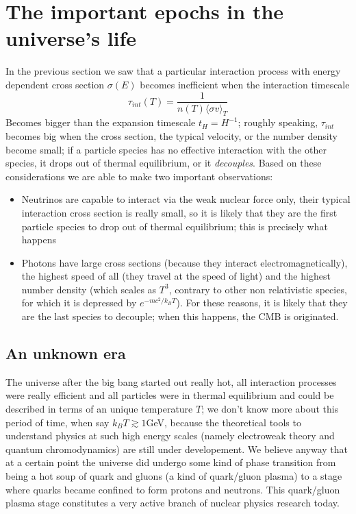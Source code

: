 \documentclass[11pt, a4paper,oneside,openright]{book}
\numberwithin{equation}{section}
\begin{document}
\section{The important epochs in the universe's life}
In the previous section we saw that a particular interaction process with energy dependent cross section $\sigma(E)$ becomes inefficient when the interaction timescale
\begin{equation}
\tau_{int}(T)=\frac{1}{n(T)\langle\sigma v\rangle_T}
\end{equation}
Becomes bigger than the expansion timescale $t_H=H^{-1}$; roughly speaking, $\tau_{int}$ becomes big when the cross section, the typical velocity, or the number density become small; if a particle species has no effective interaction with the other species, it drops out of thermal equilibrium, or it \textit{decouples}. Based on these considerations we are able to make two important observations:
\begin{itemize}
\item Neutrinos are capable to interact via the weak nuclear force only, their typical interaction cross section is really small, so it is likely that they are the first particle species to drop out of thermal equilibrium; this is precisely what happens
\item Photons have large cross sections (because they interact electromagnetically), the highest speed of all (they travel at the speed of light) and the highest number density (which scales as $T^3$, contrary to other non relativistic species, for which it is depressed by $e^{-mc^2/k_BT}$). For these reasons, it is likely that they are the last species to decouple; when this happens, the CMB is originated. 
\end{itemize}
\subsection{An unknown era}
The universe after the big bang started out really hot, all interaction processes were really efficient and all particles were in thermal equilibrium and could be described in terms of an unique temperature $T$; we don't know more about this period of time, when say $k_BT\gtrsim 1$GeV, because the theoretical tools to understand physics at such high energy scales (namely electroweak theory and quantum chromodynamics) are still under developement. We believe anyway that at a certain point the universe did undergo some kind of phase transition from being a hot soup of quark and gluons (a kind of quark/gluon plasma) to a stage where quarks became confined to form protons and neutrons. This quark/gluon plasma stage constitutes a very active branch of nuclear physics research today. 
\end{document}
